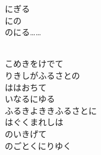 \documentclass[10pt,b5j]{tarticle} %
\begin{document}
\vspace{1.5em} %
\newcommand{\linespace}{0.5em} %
\newcommand{\blocksize}{0.5\hsize} %
\newcommand{\itemmargin}{3em} %
にぎる\\
にの\\
のにる……
\begin{enumerate} %
    \setlength{\itemindent}{\itemmargin} %
    \begin{minipage}[c]{\blocksize}
        
        \vspace{\linespace}
        \item[ ]~\\
        こめきをけでて\\
        りきしがふるさとの\\
        ははおちて\\
        いなるにゆる\\
        ふるきよききふるさとに\\
        はぐくまれしは\\
        のいきげて\\
        のごとくにりゆく
        
    \end{minipage}
    \begin{minipage}[c]{\blocksize}
        

\end{minipage}
\end{enumerate}
\end{document}
